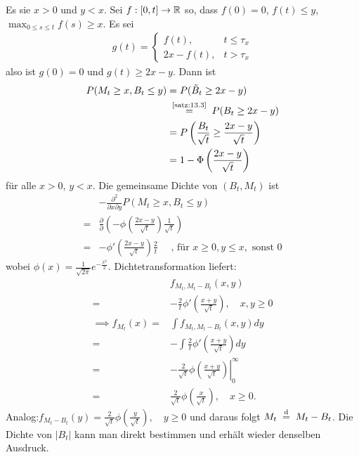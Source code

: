 \documentclass[a4paper,twoside,DIV15,BCOR12mm]{scrbook}
\begin{document}
\begin{beweis}
Es sie $x>0$ und $y<x$. Sei $f:[0,t]\to \mathbb{R}$ so, dass $f(0)=0$, $f(t)\le y$, $\max_{0\le s\le t}f(s) \ge x$. Es sei 
\begin{align*}
g(t) = 
\begin{cases}
f(t), &t\le \tau_x\\
2x-f(t), &t>\tau _x
\end{cases}
\end{align*}
also ist $g(0)=0$ und $g(t) \ge 2x-y$. Dann ist 
\begin{align*}
P(M_t\ge x, B_t\le y) &= P(\tilde B_t\ge 2x-y) \\
&\gleichnach{\ref{satz:13.3}} P(B_t\ge 2x-y) \\
&=P\left(\frac{B_t}{\sqrt{t}}\geq\frac{2x-y}{\sqrt{t}}\right) \\
&=1-\Phi\left(\frac{2x-y}{\sqrt{t}}\right)
\end{align*}
für alle $x>0$, $y<x$. Die gemeinsame Dichte von $(B_t,M_t)$ ist
\begin{align*}
 & -\frac{\partial^2}{\partial x\partial y}P(M_t\geq x,B_t\leq y) \\
=&\frac{\partial}{\partial}\left(-\phi\left(\frac{2x-y}{\sqrt{t}}\right)\frac{1}{\sqrt{t}}\right) \\
=&-\phi'\left(\frac{2x-y}{\sqrt{t}}\right)\frac{2}{t}\quad\text{ , für } x\geq0,y\leq x,\text{ sonst } 0
\end{align*}
wobei $\phi(x)=\frac{1}{\sqrt{2\pi}}e^{-\frac{x^2}{2}}$.
Dichtetransformation liefert:
\begin{align*}
  & f_{M_t,M_t-B_t}(x,y) \\
=&-\frac{2}{t}\phi'\left(\frac{x+y}{\sqrt{t}}\right),\quad x,y\geq0 \\
\implies f_{M_t}(x)=&\int f_{M_t,M_t-B_t}(x,y)dy \\
=&-\int\frac{2}{t}\phi'\left(\frac{x+y}{\sqrt{t}}\right)dy \\
=&-\frac{2}{\sqrt{t}}\phi\left.\left(\frac{x+y}{\sqrt{t}}\right)\right|_0^\infty\\
=&\frac{2}{\sqrt{t}}\phi\left(\frac{x}{\sqrt{t}}\right),\quad x\geq0.
\end{align*}
Analog:$f_{M_t-B_t}(y)=\frac{2}{\sqrt{t}}\phi\left(\frac{y}{\sqrt{t}}\right),\quad y\geq0$ und daraus folgt $M_t\gleichnach{d}M_t-B_t$.
Die Dichte von $\vert B_t\vert$ kann man direkt bestimmen und erhält wieder denselben Ausdruck.
\end{beweis}
\end{document}
